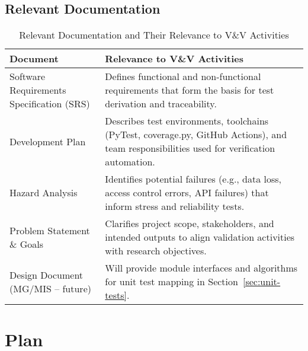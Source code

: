 \documentclass[12pt, titlepage]{article}
\begin{document}
\subsection{Relevant Documentation}



\begin{table}[H]
\centering
\caption{Relevant Documentation and Their Relevance to V\&V Activities}
\setlength{\tabcolsep}{5pt}
\renewcommand{\arraystretch}{1.2}
\footnotesize

\begin{tabularx}{\textwidth}{l X}
\toprule
\textbf{Document} & \textbf{Relevance to V\&V Activities} \\
\midrule
\arrayrulecolor[gray]{0.8}
Software Requirements Specification (SRS) &
Defines functional and non-functional requirements that form the basis for
test derivation and traceability. \\
\hline
Development Plan &
Describes test environments, toolchains (PyTest, coverage.py, GitHub Actions),
and team responsibilities used for verification automation. \\
\hline
Hazard Analysis &
Identifies potential failures (e.g., data loss, access control errors, API
failures) that inform stress and reliability tests. \\
\hline
Problem Statement \& Goals &
Clarifies project scope, stakeholders, and intended outputs to align validation
activities with research objectives. \\
\hline
Design Document (MG/MIS – future) &
Will provide module interfaces and algorithms for unit test mapping in
Section~\ref{sec:unit-tests}. \\
\bottomrule
\end{tabularx}
\end{table}

\section{Plan}
\end{document}
